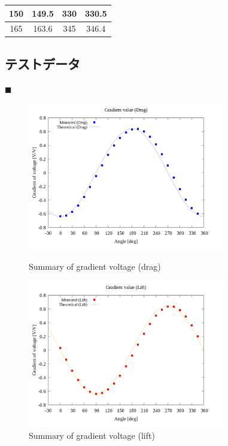 \documentclass[twocolumn,a4j]{jsarticle}
\begin{document}
\begin{table}[htbp]
\begin{center}
\begin{tabular}{|p{20mm}|p{20mm}|p{20mm}|p{20mm}|}
            \multicolumn{1}{|c|}{150}                   & \multicolumn{1}{|c|}{149.5}                & \multicolumn{1}{|c|}{330}                   & \multicolumn{1}{|c|}{330.5}  \\ \hline
            \multicolumn{1}{|c|}{165}                   & \multicolumn{1}{|c|}{163.6}                & \multicolumn{1}{|c|}{345}                   & \multicolumn{1}{|c|}{346.4}  \\ \hline
        \end{tabular}
    \end{center}
\end{table}


\newpage

\subsection{テストデータ}

$\blacksquare$ 

\begin{figure}[htbp]
    \footnotesize
    \begin{center}
        \includegraphics[width=86mm]{../graphes/simulation/21/21-1_summary_drag.png}
        \caption{Summary of gradient voltage (drag)}
        \includegraphics[width=86mm]{../graphes/simulation/21/21-1_summary_lift.png}
        \caption{Summary of gradient voltage (lift)}
    \end{center}
\end{figure}
\end{document}
